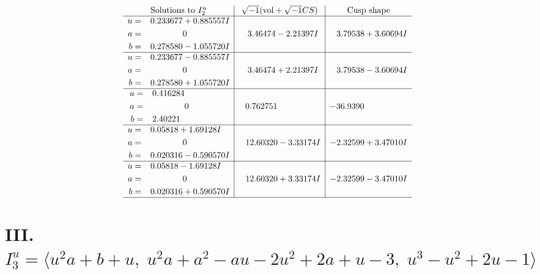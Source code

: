 \documentclass[1p]{elsarticle_modified}
\theoremstyle{definition}
\newcommand{\I}{\sqrt{-1}}
\begin{document}
$$\begin{array}{c|c|c}  
\text{Solutions to }I^u_{2}& \I (\text{vol} + \sqrt{-1}CS) & \text{Cusp shape}\\
 \hline 
\begin{aligned}
u &= \phantom{-}0.233677 + 0.885557 I \\
a &= \phantom{-0.000000 } 0 \\
b &= \phantom{-}0.278580 - 1.055720 I\end{aligned}
 & \phantom{-}3.46474 - 2.21397 I & \phantom{-}3.79538 + 3.60694 I \\ \hline\begin{aligned}
u &= \phantom{-}0.233677 - 0.885557 I \\
a &= \phantom{-0.000000 } 0 \\
b &= \phantom{-}0.278580 + 1.055720 I\end{aligned}
 & \phantom{-}3.46474 + 2.21397 I & \phantom{-}3.79538 - 3.60694 I \\ \hline\begin{aligned}
u &= \phantom{-}0.416284\phantom{ +0.000000I} \\
a &= \phantom{-0.000000 } 0 \\
b &= \phantom{-}2.40221\phantom{ +0.000000I}\end{aligned}
 & \phantom{-}0.762751\phantom{ +0.000000I} & -36.9390\phantom{ +0.000000I} \\ \hline\begin{aligned}
u &= \phantom{-}0.05818 + 1.69128 I \\
a &= \phantom{-0.000000 } 0 \\
b &= \phantom{-}0.020316 - 0.590570 I\end{aligned}
 & \phantom{-}12.60320 - 3.33174 I & -2.32599 + 3.47010 I \\ \hline\begin{aligned}
u &= \phantom{-}0.05818 - 1.69128 I \\
a &= \phantom{-0.000000 } 0 \\
b &= \phantom{-}0.020316 + 0.590570 I\end{aligned}
 & \phantom{-}12.60320 + 3.33174 I & -2.32599 - 3.47010 I\\
 \hline 
 \end{array}$$\newpage\newpage\renewcommand{\arraystretch}{1}
\centering \section*{III. $I^u_{3}= \langle u^2 a+b+u,\;u^2 a+a^2- a u-2 u^2+2 a+u-3,\;u^3- u^2+2 u-1 \rangle$}
\end{document}
